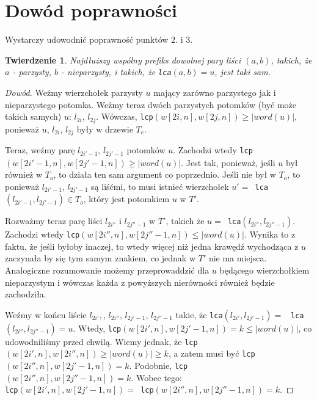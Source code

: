 \documentclass[a4paper,oneside,10pt]{book}
\newtheorem*{theorem}{Twierdzenie}
\begin{document}
\section*{Dowód poprawności}
Wystarczy udowodnić poprawność punktów $2.$ i $3.$
\begin{theorem}
Najdłuższy wspólny prefiks dowolnej pary liści $(a,b)$, takich, że $a$ - parzysty, $b$ - nieparzysty, i takich, że \verb|lca|$(a,b) = u$, jest taki sam.
\end{theorem}
\begin{proof}[Dowód]
Weźmy wierzchołek parzysty $u$ mający zarówno parzystego jak i nieparzystego potomka. Weźmy teraz dwóch parzystych potomków (być może takich samych) $u$: $l_{2i},\,l_{2j}$. Wówczas, \verb|lcp|$(w[2i,n],w[2j,n]) \geq |word(u)|$, ponieważ $u$, $l_{2i}$, $l_{2j}$ były w drzewie $T_e$.


Teraz, weźmy parę $l_{2i'-1}$, $l_{2j'-1}$ potomków $u$. Zachodzi wtedy \verb|lcp|$(w[2i'-1,n],w[2j'-1,n]) \geq |word(u)|$. Jest tak, ponieważ, jeśli $u$ był również w $T_o$, to działa ten sam argument co poprzednio. Jeśli nie był w $T_o$, to ponieważ $l_{2i'-1}$, $l_{2j'-1}$ są liśćmi, to musi istnieć wierzchołek $u' = $\verb| lca|$(l_{2i'-1}, l_{2j'-1}) \in T_o$, który jest potomkiem $u$ w $T'$. 


Rozważmy teraz parę liści $l_{2i''}$ i $l_{2j''-1}$ w $T'$, takich że $u = $\verb| lca|$(l_{2i''}, l_{2j''-1})$. Zachodzi wtedy \verb|lcp|$(w[2i'',n], w[2j''-1, n]) \leq |word(u)|$. Wynika to z faktu, że jeśli byłoby inaczej, to wtedy więcej niż jedna krawędź wychodząca z $u$ zaczynała by się tym samym znakiem, co jednak w $T'$ nie ma miejsca. Analogiczne rozumowanie możemy przeprowaddzić dla $u$ będącego wierzchołkiem nieparzystym i wówczas każda z powyższych nierówności również będzie zachodziła.

Weźmy w końcu liście $l_{2i'},$, $l_{2i''}$, $l_{2j'-1}$, $l_{2j''-1}$ takie, że \verb|lca|$(l_{2i'}, l_{2j'-1}) = $ \verb| lca|$(l_{2i''}, l_{2j''-1}) = u$. Wtedy, \verb|lcp|$(w[2i',n], w[2j'-1,n]) = k \leq |word(u)|$, co udowodniliśmy przed chwilą. Wiemy jednak, że \verb|lcp|$(w[2i',n], w[2i'',n]) \geq |word(u)| \geq k$, a zatem musi być \verb|lcp|$(w[2i'',n], w[2j'-1,n]) = k$. Podobnie, \verb|lcp|$(w[2i'',n], w[2j''-1,n]) = k$. Wobec tego: \\
\verb|lcp|$(w[2i',n],w[2j'-1,n]) = $\verb| lcp|$(w[2i'',n], w[2j''-1,n]) = k$.
\end{proof}
\end{document}
